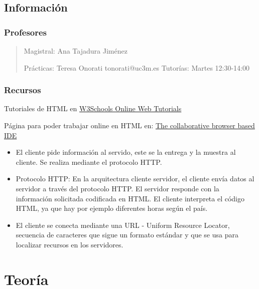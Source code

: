 \documentclass[12pt, twoside, openright]{report} %
\begin{document}
\listoffigures
\thispagestyle{fancy}





\chapter{Información}
\section{Profesores}
\begin{quote}
	Magistral: Ana Tajadura Jiménez

	Prácticas: Teresa Onorati tonorati@uc3m.es Tutorías: Martes 12:30-14:00
\end{quote}

\section{Recursos}

Tutoriales de HTML en \href{https://www.w3schools.com/}{W3Schools Online Web Tutorials}

Página para poder trabajar online en HTML en: \href{https://repl.it/}{The collaborative browser based IDE}

\begin{itemize}
	\item El cliente pide información al servido, este se la entrega y la
	      muestra al cliente. Se realiza mediante el protocolo HTTP.
	\item Protocolo HTTP: En la arquitectura cliente servidor, el cliente envía
	      datos al servidor a través del protocolo HTTP. El servidor responde
	      con la información solicitada codificada en HTML. El cliente
	      interpreta el código HTML, ya que hay por ejemplo diferentes horas
	      según el país.
	\item El cliente se conecta mediante una URL - Uniform Resource Locator,
	      secuencia de caracteres que sigue un formato estándar y que se usa
	      para localizar recursos en los servidores.
\end{itemize}

\part{Teoría}
\end{document}
